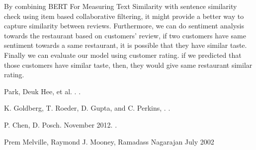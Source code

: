 \documentclass[11pt]{article}
\begin{document}
By combining BERT For Measuring Text Similarity with sentence similarity check using item based collaborative filtering, it might provide a better way to capture similarity between reviews. Furthermore, we can do sentiment analysis towards the restaurant based on customers' review, if two customers have same sentiment towards a same restaurant, it is possible that they have similar taste. Finally we can evaluate our model using customer rating. if we predicted that those customers have similar taste, then, they would give same restaurant similar rating.




\begin{thebibliography}{}

Park, Deuk Hee, et al.
.
.

K. Goldberg, T. Roeder, D. Gupta, and C. Perkins,
.
.

P. Chen, D. Posch.
\newblock November 2012.
.

Prem Melville, Raymond J. Mooney, Ramadass Nagarajan 
\newblock July 2002

\end{thebibliography}
\end{document}
